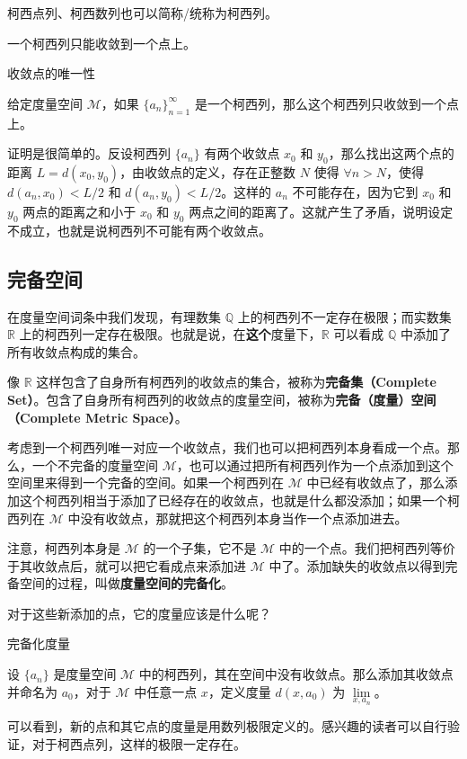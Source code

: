 柯西点列、柯西数列也可以简称/统称为柯西列。

一个柯西列只能收敛到一个点上。

\begin{theorem}{收敛点的唯一性}

给定度量空间 $\mathcal{M}$，如果 $\{a_n\}_{n=1}^{\infty}$ 是一个柯西列，那么这个柯西列只收敛到一个点上。

\end{theorem}

证明是很简单的。反设柯西列 $\{a_n\}$ 有两个收敛点 $x_0$ 和 $y_0$，那么找出这两个点的距离 $L=d(x_0, y_0)$，由收敛点的定义，存在正整数 $N$ 使得 $\forall n>N$，使得 $d(a_n, x_0)<L/2$ 和 $d(a_n, y_0)<L/2$。这样的 $a_n$ 不可能存在，因为它到 $x_0$ 和 $y_0$ 两点的距离之和小于 $x_0$ 和 $y_0$ 两点之间的距离了。这就产生了矛盾，说明设定不成立，也就是说柯西列不可能有两个收敛点。


\subsection{完备空间}

在度量空间词条中我们发现，有理数集 $\mathbb{Q}$ 上的柯西列不一定存在极限；而实数集 $\mathbb{R}$ 上的柯西列一定存在极限。也就是说，在\textbf{这个}度量下，$\mathbb{R}$ 可以看成 $\mathbb{Q}$ 中添加了所有收敛点构成的集合。

像 $\mathbb{R}$ 这样包含了自身所有柯西列的收敛点的集合，被称为\textbf{完备集（Complete Set）}。包含了自身所有柯西列的收敛点的度量空间，被称为\textbf{完备（度量）空间（Complete Metric Space）}。

考虑到一个柯西列唯一对应一个收敛点，我们也可以把柯西列本身看成一个点。那么，一个不完备的度量空间 $\mathcal{M}$，也可以通过把所有柯西列作为一个点添加到这个空间里来得到一个完备的空间。如果一个柯西列在 $\mathcal{M}$ 中已经有收敛点了，那么添加这个柯西列相当于添加了已经存在的收敛点，也就是什么都没添加；如果一个柯西列在 $\mathcal{M}$ 中没有收敛点，那就把这个柯西列本身当作一个点添加进去。

注意，柯西列本身是 $\mathcal{M}$ 的一个子集，它不是 $\mathcal{M}$ 中的一个点。我们把柯西列等价于其收敛点后，就可以把它看成点来添加进 $\mathcal{M}$ 中了。添加缺失的收敛点以得到完备空间的过程，叫做\textbf{度量空间的完备化}。

对于这些新添加的点，它的度量应该是什么呢？

\begin{definition}{完备化度量}

设 $\{a_n\}$ 是度量空间 $\mathcal{M}$ 中的柯西列，其在空间中没有收敛点。那么添加其收敛点并命名为 $a_0$，对于 $\mathcal{M}$ 中任意一点 $x$，定义度量 $d(x, a_0)$ 为 $\lim\limits_{x, a_n}$。

\end{definition}

可以看到，新的点和其它点的度量是用数列极限定义的。感兴趣的读者可以自行验证，对于柯西点列，这样的极限一定存在。
